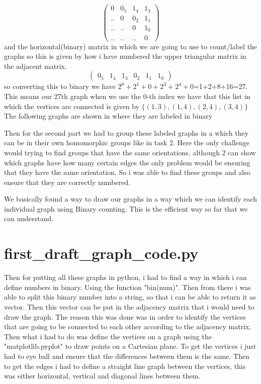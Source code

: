 \documentclass{Assignment}
\begin{document}
\begin{equation}
\begin{pmatrix}
	0&0_5&1_4&1_3\\
	..&0&0_2&1_1\\
	..&..&0&1_0\\
	..&..&..&0
\end{pmatrix}
\end{equation}
and the horizontal(binary) matrix in which we are going to use to count/label the graphs so this is given by how i have numbered the upper triangular matrix in the adjacent matrix.\begin{equation}
	\begin{pmatrix}
		0_5&1_4&1_3&0_2&1_1&1_0
	\end{pmatrix}
\end{equation}
 so converting this to binary we have $2^0+2^1+0+2^3+2^4+0$=1+2+8+16=27.\newline
 This means our 27th graph when we use the 0-th index we have that this list in which the vertices are connected is given by $\{(1,3),(1,4),(2,4),(3,4)\}$\newline
 The following graphs are shown in where they are labeled in binary

Then for the second part we had to group these labeled graphs in a which they can be in their own homomorphic groups like in task 2.
 Here the only challenge would trying to find groups that have the same orientations, although 2 can show which graphs have how many certain edges the only problem would be ensuring that they have the same orientation.
  So i was able to find these groups and also ensure that they are correctly numbered.

 We basically found a way to draw our graphs in a way which we can identify each individual graph using Binary counting. This is the efficient way so far that we can understand.\newpage
 \section*{first\_draft\_graph\_code.py}
Then for putting all these graphs in python, i had to find a way in which i can define numbers in binary. 
Using the function "bin(num)".
Then from there i was able to split this binary number into a string, so that i can be able to return it as vector.
Then this vector can be put in the adjacency matrix that i would need to draw the graph.
The reason this was done was in order to identify the vertices that are going to be connected to each other according to the adjacency matrix.
Then what i had to do was define the vertices on a graph using the "matplotlib.pyplot" to draw points on a Cartesian plane. 
To get the vertices i just had to eye ball and ensure that the differences between them is the same.
Then to get the edges i had to define a straight line graph between the vertices, this was either horizontal, vertical and diagonal lines between them.
\end{document}
